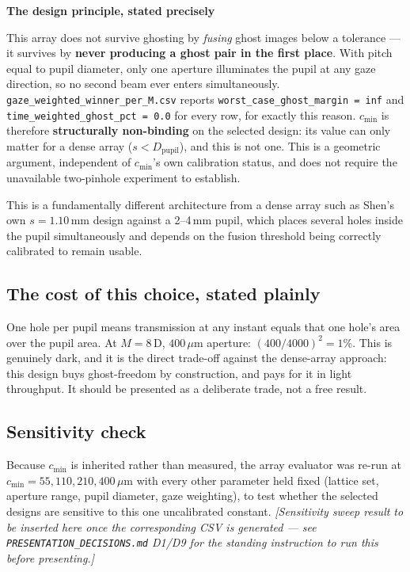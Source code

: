 \documentclass[11pt]{report}
\newenvironment{keybox}[1]%
{\par\vspace{6pt}\begin{lrbox}{\kbsave}\begin{minipage}{0.88\textwidth}%
{\bfseries\color{hbblue}#1}\par\vspace{4pt}\ignorespaces}%
{\end{minipage}\end{lrbox}%
\begin{center}\setlength{\fboxrule}{1.2pt}\setlength{\fboxsep}{7pt}%
\fcolorbox{hbblue}{boxgrey}{\usebox{\kbsave}}\end{center}\vspace{6pt}\par}
\begin{document}
\begin{keybox}{The design principle, stated precisely}
This array does not survive ghosting by \emph{fusing} ghost images below a tolerance --- it
survives by \textbf{never producing a ghost pair in the first place}. With pitch equal to
pupil diameter, only one aperture illuminates the pupil at any gaze direction, so no second
beam ever enters simultaneously. \texttt{gaze\_weighted\_winner\_per\_M.csv} reports
\texttt{worst\_case\_ghost\_margin = inf} and \texttt{time\_weighted\_ghost\_pct = 0.0} for
every row, for exactly this reason. $c_{\min}$ is therefore \textbf{structurally
non-binding} on the selected design: its value can only matter for a dense array
($s < D_{\text{pupil}}$), and this is not one. This is a geometric argument, independent of
$c_{\min}$'s own calibration status, and does not require the unavailable two-pinhole
experiment to establish.
\end{keybox}

This is a fundamentally different architecture from a dense array such as Shen's own
$s=1.10$\,mm design against a 2--4\,mm pupil, which places several holes inside the pupil
simultaneously and depends on the fusion threshold being correctly calibrated to remain
usable.

\subsection{The cost of this choice, stated plainly}

One hole per pupil means transmission at any instant equals that one hole's area over the
pupil area. At $M=8$\,D, $400\,\mu$m aperture: $(400/4000)^2 = 1\%$. This is genuinely dark,
and it is the direct trade-off against the dense-array approach: this design buys
ghost-freedom by construction, and pays for it in light throughput. It should be presented
as a deliberate trade, not a free result.

\subsection{Sensitivity check}

Because $c_{\min}$ is inherited rather than measured, the array evaluator was re-run at
$c_{\min} = 55, 110, 210, 400\,\mu$m with every other parameter held fixed (lattice set,
aperture range, pupil diameter, gaze weighting), to test whether the selected designs are
sensitive to this one uncalibrated constant. \emph{[Sensitivity sweep result to be inserted
here once the corresponding CSV is generated --- see \texttt{PRESENTATION\_DECISIONS.md}
D1/D9 for the standing instruction to run this before presenting.]}
\end{document}

